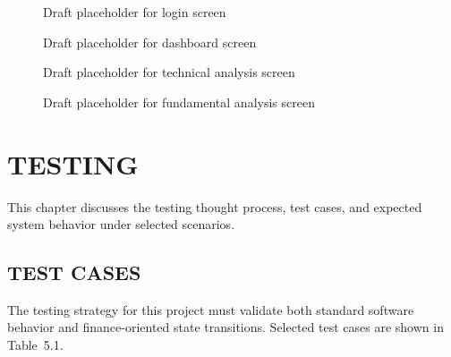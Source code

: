\documentclass[12pt,a4paper]{report}
\begin{document}
\begin{figure}[H]
\centering
{}
\caption{Draft placeholder for login screen}
\end{figure}

\begin{figure}[H]
\centering
{}
\caption{Draft placeholder for dashboard screen}
\end{figure}

\begin{figure}[H]
\centering
{}
\caption{Draft placeholder for technical analysis screen}
\end{figure}

\begin{figure}[H]
\centering
{}
\caption{Draft placeholder for fundamental analysis screen}
\end{figure}

\chapter{TESTING}
This chapter discusses the testing thought process, test cases, and expected system behavior under selected scenarios.

\section{TEST CASES}
The testing strategy for this project must validate both standard software behavior and finance-oriented state transitions. Selected test cases are shown in Table~5.1.
\end{document}
